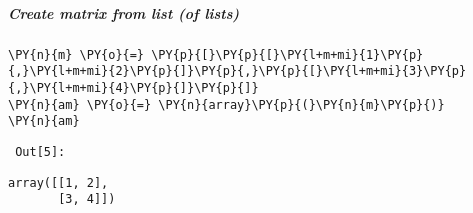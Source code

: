     \subparagraph{Create matrix from list (of lists)}



{\par%
\vspace{-1\baselineskip}%
}%
\begin{notebookcell}[5]%
\begin{addmargin}[\cellleftmargin]{0em}%
{\smaller%
\par%
%
\vspace{-1\smallerfontscale}%
\begin{Verbatim}[commandchars=\\\{\}]
\PY{n}{m} \PY{o}{=} \PY{p}{[}\PY{p}{[}\PY{l+m+mi}{1}\PY{p}{,}\PY{l+m+mi}{2}\PY{p}{]}\PY{p}{,}\PY{p}{[}\PY{l+m+mi}{3}\PY{p}{,}\PY{l+m+mi}{4}\PY{p}{]}\PY{p}{]}
\PY{n}{am} \PY{o}{=} \PY{n}{array}\PY{p}{(}\PY{n}{m}\PY{p}{)}
\PY{n}{am}
\end{Verbatim}
%
\par%
\vspace{-1\smallerfontscale}}%
\end{addmargin}
\end{notebookcell}

\par\vspace{1\smallerfontscale}%
    
        {\par%
        \vspace{-1\smallerfontscale}%
        \noindent%
        \begin{minipage}{\cellleftmargin}%
    \hfill%
    {\smaller%
    \tt%
    \color{nbframe-out-prompt}%
    Out[5]:}%
    \hspace{\inputpadding}%
    \hspace{0em}%
    \hspace{3pt}%
    \end{minipage}%
        }%
    \begin{addmargin}[\cellleftmargin]{0em}%
    {\smaller%
    \vspace{-1\smallerfontscale}%
    
    
    
    \begin{verbatim}
array([[1, 2],
       [3, 4]])
    \end{verbatim}

    
}%
    \end{addmargin}%

